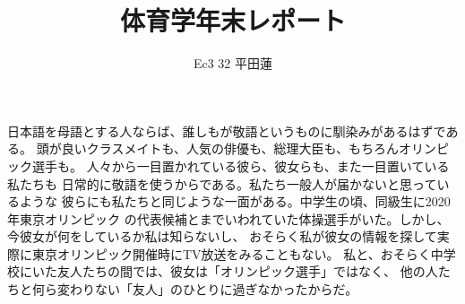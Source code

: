 \documentclass[]{jsarticle}
\title{体育学年末レポート}
\author{Ec3 32 平田蓮}
\date{}
\begin{document}
\maketitle
日本語を母語とする人ならば、誰しもが敬語というものに馴染みがあるはずである。
頭が良いクラスメイトも、人気の俳優も、総理大臣も、もちろんオリンピック選手も。
人々から一目置かれている彼ら、彼女らも、また一目置いている私たちも
日常的に敬語を使うからである。私たち一般人が届かないと思っているような
彼らにも私たちと同じような一面がある。中学生の頃、同級生に2020年東京オリンピック
の代表候補とまでいわれていた体操選手がいた。しかし、今彼女が何をしているか私は知らないし、
おそらく私が彼女の情報を探して実際に東京オリンピック開催時にTV放送をみることもない。
私と、おそらく中学校にいた友人たちの間では、彼女は「オリンピック選手」ではなく、
他の人たちと何ら変わりない「友人」のひとりに過ぎなかったからだ。
\end{document}
